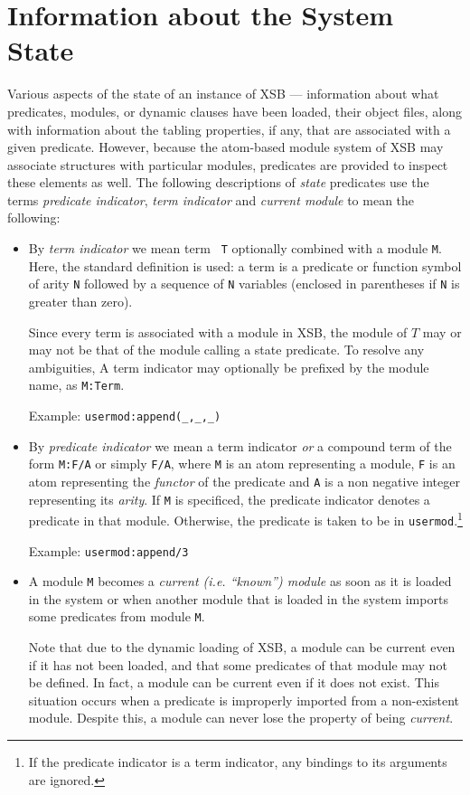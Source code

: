 \section{Information about the System State} \label{State}
 

Various aspects of the state of an instance of XSB --- information
about what predicates, modules, or dynamic clauses have been loaded,
their object files, along with information about the tabling
properties, if any, that are associated with a given predicate.
However, because the atom-based module system of XSB may associate
structures with particular modules, predicates are provided to inspect
these elements as well.  The following descriptions of {\em state}
predicates use the terms {\em predicate indicator}, {\em term
  indicator} and {\em current module} to mean the following:
 
\begin{itemize}
\item By {\em term indicator}  we mean term {\tt
  T} optionally combined with a module {\tt M}.  Here, the standard
  definition is used: a term is a predicate or function symbol of
  arity {\tt N} followed by a sequence of {\tt N} variables (enclosed
  in parentheses if {\tt N} is greater than zero).

  Since every term is associated with a module in XSB, the module of
  $T$ may or may not be that of the module calling a state predicate.
  To resolve any ambiguities, A term indicator may optionally be
  prefixed by the module name, as {\tt M:Term}.

  Example: {\tt usermod:append(\_,\_,\_)}
\item By {\em predicate indicator}  we mean
  a term indicator {\em or} a compound term of the form {\tt M:F/A} or
  simply {\tt F/A}, where {\tt M} is an atom representing a module,
  {\tt F} is an atom representing the {\em functor} of the predicate
  and {\tt A} is a non negative integer representing its {\em arity}.
  If {\tt M} is specificed, the predicate indicator denotes a
  predicate in that module.  Otherwise, the predicate is taken to be
  in {\tt usermod}.\footnote{If the predicate indicator is a term
    indicator, any bindings to its arguments are ignored.}

      Example: {\tt usermod:append/3}
\item A module {\tt M} becomes a {\em current (i.e. ``known'') module} as
      soon as it is loaded in the system or when another module that is
      loaded in the system imports some predicates from module {\tt M}.

      Note that due to the dynamic loading of XSB, a module can be
      current even if it has not been loaded, and that some predicates
      of that module may not be defined. In fact, a module can be
      current even if it does not exist.  This situation occurs when a
      predicate is improperly imported from a non-existent module.
      Despite this, a module can never lose the property of being {\em
        current}.
\end{itemize}

